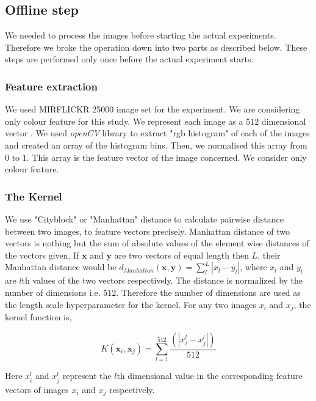 \documentclass[english]{tktltiki}
\begin{document}
\subsection{Offline step}

We needed to process the images before starting the actual experiments. Therefore we broke the operation down into two parts as described below. These steps are performed only once before the actual experiment starts.

\subsubsection{Feature extraction}

We used MIRFLICKR 25000 \cite{mirflickr} image set for the experiment. We are considering only colour feature for this study. We represent each image as a 512 dimensional vector \cite{imse}. We used \textit{openCV} library to extract "rgb histogram" of each of the images and created an array of the histogram bins. Then, we normalised this array from $0$ to $1$. This array is the feature vector of the image concerned. We consider only colour feature.

\subsubsection{The Kernel}

We use "Cityblock" or "Manhattan" distance to calculate pairwise distance between two images, to feature vectors precisely. Manhattan distance of two vectors is nothing but the sum of absolute values of the element wise distances of the vectors given. If $\mathbf{x}$ and $\mathbf{y}$ are two vectors of equal length then $L$, their Manhattan distance would be $d_{Manhattan}(\mathbf{x}, \mathbf{y}) = \sum \limits_l^L |x_l - y_l|$, where $x_l$ and $y_l$ are $l$th values of the two vectors respectively. The distance is normalized by the number of dimensions i.e. 512. Therefore the number of dimensions are used as the length scale hyperparameter for the kernel. For any two images $x_i$ and $x_j$, the kernel function is,

\begin{equation}
K(\mathbf{x}_i, \mathbf{x}_j) = \sum_{l = 1}^{512}\frac{(|x_i^l - x_j^l|)} {512}
\end{equation}

Here $x_i^l$ and $x_j^l$ represent the $l$th dimensional value in the corresponding feature vectors of images $x_i$ and $x_j$ respectively.
\end{document}
